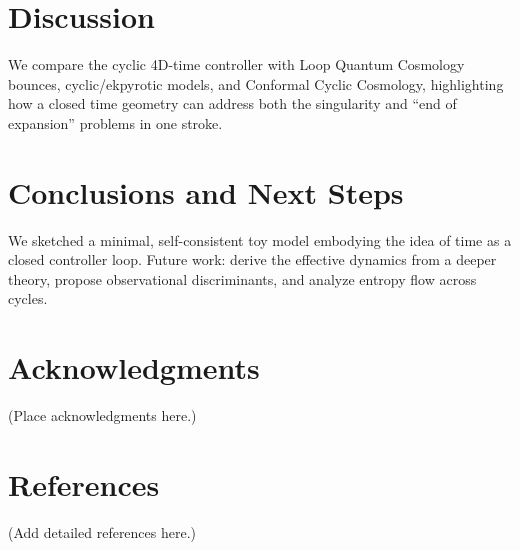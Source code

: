 \documentclass[12pt]{article}
\begin{document}
\section{Discussion}
We compare the cyclic 4D-time controller with Loop Quantum Cosmology bounces, cyclic/ekpyrotic models,
and Conformal Cyclic Cosmology, highlighting how a closed time geometry can address both the singularity
and ``end of expansion'' problems in one stroke.

\section{Conclusions and Next Steps}
We sketched a minimal, self-consistent toy model embodying the idea of time as a closed controller loop.
Future work: derive the effective dynamics from a deeper theory, propose observational discriminants,
and analyze entropy flow across cycles.

\section*{Acknowledgments}
(Place acknowledgments here.)

\section*{References}
(Add detailed references here.)
\end{document}
